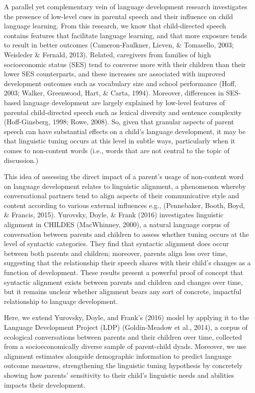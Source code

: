 \documentclass[10pt, letterpaper]{article}
\begin{document}
A parallel yet complementary vein of language development research
investigates the presence of low-level cues in parental speech and their
influence on child language learning. From this research, we know that
child-directed speech contains features that facilitate language
learning, and that more exposure tends to result in better outcomes
(Cameron-Faulkner, Lieven, \& Tomasello, 2003; Weisleder \& Fernald,
2013). Related, caregivers from families of high socioeconomic status
(SES) tend to converse more with their children than their lower SES
counterparts, and these increases are associated with improved
development outcomes such as vocabulary size and school performance
(Hoff, 2003; Walker, Greenwood, Hart, \& Carta, 1994). Moreover,
differences in SES-based language development are largely explained by
low-level features of parental child-directed speech such as lexical
diversity and sentence complexity (Hoff-Ginsberg, 1998; Rowe, 2008). So,
given that granular aspects of parent speech can have substantial
effects on a child's language development, it may be that linguistic
tuning occurs at this level in subtle ways, particularly when it comes
to non-content words (i.e., words that are not central to the topic of
discussion.)

This idea of assessing the direct impact of a parent's usage of
non-content word on language development relates to linguistic
alignment, a phenomenon whereby conversational partners tend to align
aspects of their communicative style and content according to various
external influences e.g., (Pennebaker, Booth, Boyd, \& Francis, 2015).
Yurovsky, Doyle, \& Frank (2016) investigates linguistic alignment in
CHILDES (MacWhinney, 2000), a natural language corpus of conversation
between parents and children to assess whether tuning occurs at the
level of syntactic categories. They find that syntactic alignment does
occur between both parents and children; moreover, parents align less
over time, suggesting that the relationship their speech shares with
their child's changes as a function of development. These results
present a powerful proof of concept that syntactic alignment exists
between parents and children and changes over time, but it remains
unclear whether alignment bears any sort of concrete, impactful
relationship to language development.

Here, we extend Yurovsky, Doyle, and Frank's (2016) model by applying it
to the Language Development Project (LDP) (Goldin-Meadow et al., 2014),
a corpus of ecological conversations between parents and their children
over time, collected from a socioeconomically diverse sample of
parent-child dyads. Moreover, we use alignment estimates alongside
demographic information to predict language outcome measures,
strengthening the linguistic tuning hypothesis by concretely showing how
parents' sensitivity to their child's linguistic needs and abilities
impacts their development.
\end{document}
